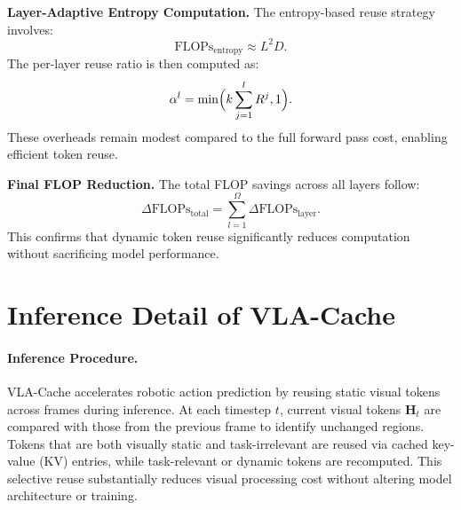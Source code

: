 \noindent
\textbf{Layer-Adaptive Entropy Computation.} 
The entropy-based reuse strategy involves:
\begin{equation}
\label{eq:entropy_cost}
\text{FLOPs}_{\text{entropy}} \approx L^2 D.
\end{equation}
The per-layer reuse ratio is then computed as:
\begin{equation}
\label{eq:reuse_ratio_append}
\alpha^l = \min\Bigl( k \sum_{j=1}^l R^j, 1 \Bigr).
\end{equation}
These overheads remain modest compared to the full forward pass cost, enabling efficient token reuse.

\noindent
\textbf{Final FLOP Reduction.} 
The total FLOP savings across all layers follow:
\begin{equation}
\label{eq:total_flop_savings}
\Delta \text{FLOPs}_{\text{total}} = \sum_{l=1}^{\Omega} \Delta \text{FLOPs}_{\text{layer}}.
\end{equation}
This confirms that dynamic token reuse significantly reduces computation without sacrificing model performance.

\section{Inference Detail of VLA-Cache}
\label{app:inference_detail}
\paragraph{Inference Procedure.}
VLA-Cache accelerates robotic action prediction by reusing static visual tokens across frames during inference. At each timestep \( t \), current visual tokens \( \mathbf{H}_t \) are compared with those from the previous frame to identify unchanged regions. Tokens that are both visually static and task-irrelevant are reused via cached key-value (KV) entries, while task-relevant or dynamic tokens are recomputed. This selective reuse substantially reduces visual processing cost without altering model architecture or training.

